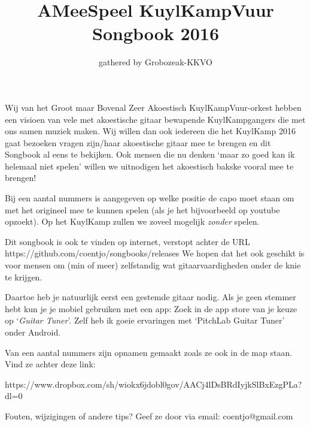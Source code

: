 \documentclass[a4,openany,landscape]{article}
\title{AMeeSpeel KuylKampVuur Songbook 2016}
\author{gathered by Grobozeak-KKVO}
\begin{document}

\maketitle
Wij van het Groot maar Bovenal Zeer Akoestisch KuylKampVuur-orkest hebben een visioen van vele met akoestische gitaar bewapende KuylKampgangers die met ons samen muziek maken. Wij willen dan ook iedereen die het KuylKamp 2016 gaat bezoeken vragen zijn/haar akoestische gitaar mee te brengen en dit Songbook al eens te bekijken. Ook mensen die nu denken `maar zo goed kan ik helemaal niet spelen' willen we uitnodigen het akoestisch bakske vooral mee te brengen! 

Bij een aantal nummers is aangegeven op welke positie de capo moet staan om met het origineel mee te kunnen spelen (als je het bijvoorbeeld op youtube opzoekt). Op het KuylKamp zullen we zoveel mogelijk \emph{zonder} spelen.  

Dit songbook is ook te vinden op internet, verstopt achter de URL 
https://github.com/coentjo/songbooks/releases
We hopen dat het ook geschikt is voor mensen om (min of meer) zelfstandig wat gitaarvaardigheden onder de knie te krijgen. 

Daartoe heb je natuurlijk eerst een gestemde gitaar nodig. Als je geen stemmer hebt kun je je mobiel gebruiken met een app: Zoek in de app store van je keuze op `\emph{Guitar Tuner}'. Zelf heb ik goeie ervaringen met `PitchLab Guitar Tuner' onder Android. 

Van een aantal nummers zijn opnamen gemaakt zoals ze ook in de map staan. Vind ze achter deze link: 

https://www.dropbox.com/sh/wiokx6jdobl0gov/AACj4lDsBRdIyjkSlBxEzgPLa?dl=0

Fouten, wijzigingen of andere tips? Geef ze door via email:  coentjo@gmail.com 





\end{document}
